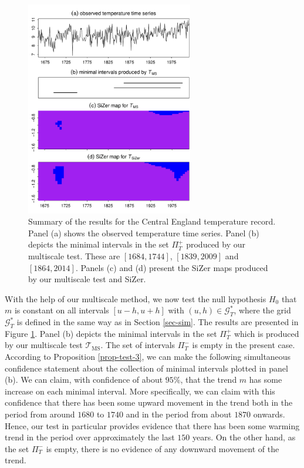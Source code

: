 \begin{figure}[t!]
\centering
\includegraphics[width=0.65\textwidth]{Plots/UK_temperature.pdf}
\caption{Summary of the results for the Central England temperature record. Panel (a) shows the observed temperature time series. Panel (b) depicts the minimal intervals in the set $\Pi_T^+$ produced by our multiscale test. These are $[1684,1744]$, $[1839,2009]$ and $[1864,2014]$. Panels (c) and (d) present the SiZer maps produced by our multiscale test and SiZer. }\label{fig:app:UK}
\end{figure}


With the help of our multiscale method, we now test the null hypothesis $H_0$ that $m$ is constant on all intervals $[u-h,u+h]$ with $(u,h) \in \mathcal{G}_T^*$, where the grid $\mathcal{G}_T^*$ is defined in the same way as in Section \ref{sec-sim}. The results are presented in Figure \ref{fig:app:UK}. Panel (b) depicts the minimal intervals in the set $\Pi_T^+$ which is produced by our multiscale test $\mathcal{T}_{\text{MS}}$. The set of intervals $\Pi_T^-$ is empty in the present case. 
According to Proposition \ref{prop-test-3}, we can make the following simultaneous confidence statement about the collection of minimal intervals plotted in panel (b). We can claim, with confidence of about $95\%$, that the trend $m$ has some increase on each minimal interval. More specifically, we can claim with this confidence that there has been some upward movement in the trend both in the period from around $1680$ to $1740$ and in the period from about $1870$ onwards. Hence, our test in particular provides evidence that there has been some warming trend in the period over approximately the last $150$ years. On the other hand, as the set $\Pi_T^-$ is empty, there is no evidence of any downward movement of the trend.


